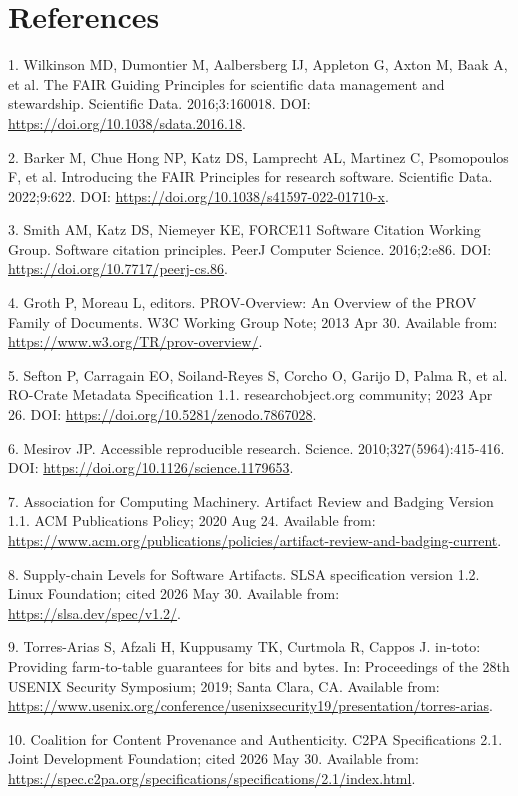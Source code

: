 \documentclass[10pt]{article}
\begin{document}
\section*{References}

1. Wilkinson MD, Dumontier M, Aalbersberg IJ, Appleton G, Axton M, Baak A, et al. The FAIR Guiding Principles for scientific data management and stewardship. Scientific Data. 2016;3:160018. DOI: \url{https://doi.org/10.1038/sdata.2016.18}.

2. Barker M, Chue Hong NP, Katz DS, Lamprecht AL, Martinez C, Psomopoulos F, et al. Introducing the FAIR Principles for research software. Scientific Data. 2022;9:622. DOI: \url{https://doi.org/10.1038/s41597-022-01710-x}.

3. Smith AM, Katz DS, Niemeyer KE, FORCE11 Software Citation Working Group. Software citation principles. PeerJ Computer Science. 2016;2:e86. DOI: \url{https://doi.org/10.7717/peerj-cs.86}.

4. Groth P, Moreau L, editors. PROV-Overview: An Overview of the PROV Family of Documents. W3C Working Group Note; 2013 Apr 30. Available from: \url{https://www.w3.org/TR/prov-overview/}.

5. Sefton P, Carragain EO, Soiland-Reyes S, Corcho O, Garijo D, Palma R, et al. RO-Crate Metadata Specification 1.1. researchobject.org community; 2023 Apr 26. DOI: \url{https://doi.org/10.5281/zenodo.7867028}.

6. Mesirov JP. Accessible reproducible research. Science. 2010;327(5964):415-416. DOI: \url{https://doi.org/10.1126/science.1179653}.

7. Association for Computing Machinery. Artifact Review and Badging Version 1.1. ACM Publications Policy; 2020 Aug 24. Available from: \url{https://www.acm.org/publications/policies/artifact-review-and-badging-current}.

8. Supply-chain Levels for Software Artifacts. SLSA specification version 1.2. Linux Foundation; cited 2026 May 30. Available from: \url{https://slsa.dev/spec/v1.2/}.

9. Torres-Arias S, Afzali H, Kuppusamy TK, Curtmola R, Cappos J. in-toto: Providing farm-to-table guarantees for bits and bytes. In: Proceedings of the 28th USENIX Security Symposium; 2019; Santa Clara, CA. Available from: \url{https://www.usenix.org/conference/usenixsecurity19/presentation/torres-arias}.

10. Coalition for Content Provenance and Authenticity. C2PA Specifications 2.1. Joint Development Foundation; cited 2026 May 30. Available from: \url{https://spec.c2pa.org/specifications/specifications/2.1/index.html}.
\end{document}
